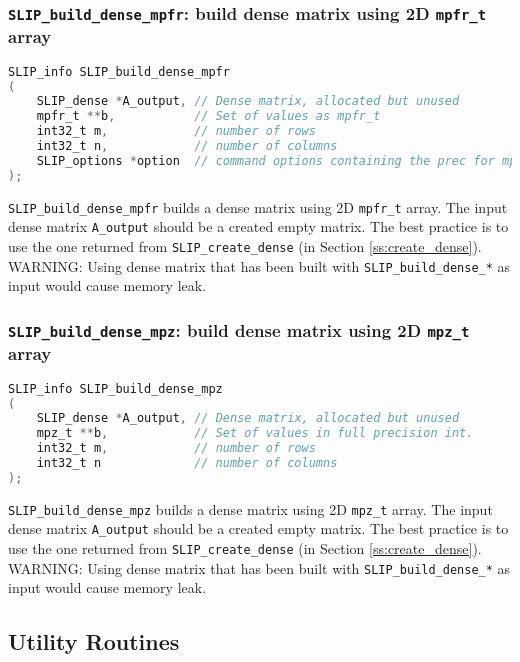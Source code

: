 \documentclass[11pt]{article}
\theoremstyle{definition}
\begin{document}
\cprotect\subsubsection{\verb|SLIP_build_dense_mpfr|: build dense matrix using 2D \verb|mpfr_t| array}\label{s:user:build_dense_mpfr}
\begin{lstlisting}[language=C,frame=single]
SLIP_info SLIP_build_dense_mpfr
(
    SLIP_dense *A_output, // Dense matrix, allocated but unused
    mpfr_t **b,           // Set of values as mpfr_t
    int32_t m,            // number of rows
    int32_t n,            // number of columns
    SLIP_options *option  // command options containing the prec for mpfr
);
\end{lstlisting}

\verb|SLIP_build_dense_mpfr| builds a dense matrix using 2D \verb|mpfr_t| array. The input dense matrix \verb|A_output| should be a created empty matrix. The best practice is to use the one returned from \verb|SLIP_create_dense| (in Section \ref{ss:create_dense}). WARNING: Using dense matrix that has been built with \verb|SLIP_build_dense_*| as input would cause memory leak.



\cprotect\subsubsection{\verb|SLIP_build_dense_mpz|: build dense matrix using 2D \verb|mpz_t| array}\label{s:user:build_dense_mpz}
\begin{lstlisting}[language=C,frame=single]
SLIP_info SLIP_build_dense_mpz
(
    SLIP_dense *A_output, // Dense matrix, allocated but unused
    mpz_t **b,            // Set of values in full precision int.
    int32_t m,            // number of rows
    int32_t n             // number of columns
);
\end{lstlisting}

\verb|SLIP_build_dense_mpz| builds a dense matrix using 2D \verb|mpz_t| array. The input dense matrix \verb|A_output| should be a created empty matrix. The best practice is to use the one returned from \verb|SLIP_create_dense| (in Section \ref{ss:create_dense}). WARNING: Using dense matrix that has been built with \verb|SLIP_build_dense_*| as input would cause memory leak.





\subsection{Utility Routines}
\end{document}

